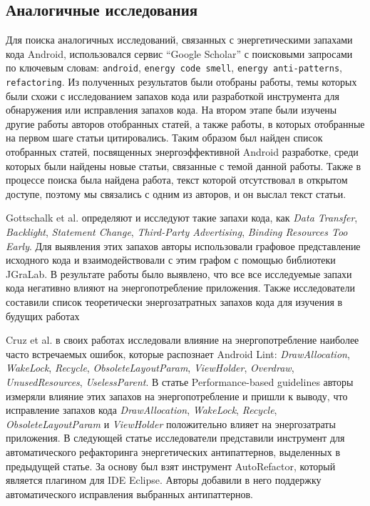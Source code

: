 \label{sec:relatedworks}


\subsection{Аналогичные исследования}


Для поиска аналогичных исследований, связанных с энергетическими запахами кода Android, использовался сервис “Google Scholar” с поисковыми запросами по ключевым словам: \texttt{android}, \texttt{energy code smell}, \texttt{energy anti-patterns}, \texttt{refactoring}. Из полученных результатов были отобраны работы, темы которых были схожи с исследованием запахов кода или разработкой инструмента для обнаружения или исправления запахов кода. На втором этапе были изучены другие работы авторов отобранных статей, а также работы, в которых отобранные на первом шаге статьи цитировались. Таким образом был найден список отобранных статей, посвященных энергоэффективной Android разработке, среди которых были найдены новые статьи, связанные с темой данной работы. Также в процессе поиска была найдена работа, текст которой отсутствовал в открытом доступе, поэтому мы связались с одним из авторов, и он выслал текст статьи.

Gottschalk et al. \cite{gottschalk2016refactorings} определяют и исследуют такие запахи кода, как \emph{Data Transfer}, \emph{Backlight}, \emph{Statement Change}, \emph{Third-Party Advertising}, \emph{Binding Resources Too Early}. Для выявления этих запахов авторы использовали графовое представление исходного кода и взаимодействовали с этим графом с помощью библиотеки JGraLab. В результате работы было выявлено, что все все исследуемые запахи кода негативно влияют на энергопотребление приложения. Также исследователи составили список теоретически энергозатратных запахов кода для изучения в будущих работах

Cruz et al. в своих работах исследовали влияние на энергопотребление наиболее часто встречаемых ошибок, которые распознает Android Lint: \emph{DrawAllocation}, \emph{WakeLock}, \emph{Recycle}, \emph{ObsoleteLayoutParam}, \emph{ViewHolder}, \emph{Overdraw}, \emph{UnusedResources}, \emph{UselessParent}.
В статье Performance-based guidelines \cite{cruz2017performance} авторы измеряли влияние этих запахов на энергопотребление и пришли к выводу, что исправление запахов кода \emph{DrawAllocation}, \emph{WakeLock}, \emph{Recycle}, \emph{ObsoleteLayoutParam} и \emph{ViewHolder} положительно влияет на энергозатраты приложения. 
В следующей статье \cite{cruz2018using} исследователи представили инструмент для автоматического рефакторинга энергетических антипаттернов, выделенных в предыдущей статье. За основу был взят инструмент AutoRefactor, который является плагином для IDE Eclipse. Авторы добавили в него поддержку автоматического исправления выбранных антипаттернов. 


